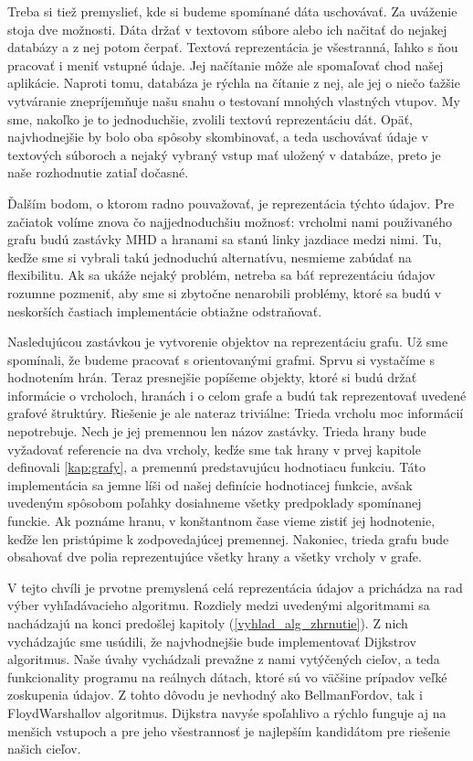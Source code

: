 Treba si tiež premyslieť, kde si budeme spomínané dáta uschovávať. Za uváženie stoja dve možnosti. Dáta držať v textovom súbore alebo ich načitať do nejakej databázy a z nej potom čerpať. Textová reprezentácia je všestranná, ľahko s ňou pracovať i meniť vstupné údaje. Jej načítanie môže ale spomaľovať chod našej aplikácie. Naproti tomu, databáza je rýchla na čítanie z nej, ale jej o niečo ťažšie vytváranie znepríjemňuje našu snahu o testovaní mnohých vlastných vtupov. My sme, nakoľko je to jednoduchšie, zvolili textovú reprezentáciu dát. Opäť, najvhodnejšie by bolo oba spôsoby skombinovať, a teda uschovávať údaje v textových súboroch a nejaký vybraný vstup mať uložený v databáze, preto je naše rozhodnutie zatiaľ dočasné.\newline

Ďalším bodom, o ktorom radno pouvažovať, je reprezentácia týchto údajov. Pre začiatok volíme znova čo najjednoduchšiu možnosť: vrcholmi nami použivaného grafu budú zastávky MHD a hranami sa stanú linky jazdiace medzi nimi. Tu, keďže sme si vybrali takú jednoduchú alternatívu, nesmieme zabúdať na flexibilitu. Ak sa ukáže nejaký problém, netreba sa báť reprezentáciu údajov rozumne pozmeniť, aby sme si zbytočne nenarobili problémy, ktoré sa budú v neskorších častiach implementácie obtiažne odstraňovať.\newline

Nasledujúcou zastávkou je vytvorenie objektov na reprezentáciu grafu. Už sme spomínali, že budeme pracovať s orientovanými grafmi. Sprvu si vystačíme s hodnotením hrán. Teraz presnejšie popíšeme objekty, ktoré si budú držať informácie o vrcholoch, hranách i o celom grafe a budú tak reprezentovať uvedené grafové štruktúry. Riešenie je ale nateraz triviálne: Trieda vrcholu moc informácií nepotrebuje. Nech je jej premennou len názov zastávky. Trieda hrany bude vyžadovať referencie na dva vrcholy, keďźe sme tak hrany v prvej kapitole definovali \ref{kap:grafy}, a premennú predstavujúcu hodnotiacu funkciu. Táto implementácia sa jemne líši od našej definície hodnotiacej funkcie, avšak uvedeným spôsobom poľahky dosiahneme všetky predpoklady spomínanej funckie. Ak poznáme hranu, v konštantnom čase vieme zistiť jej hodnotenie, keďže len pristúpime k zodpovedajúcej premennej. Nakoniec, trieda grafu bude obsahovať dve polia reprezentujúce všetky hrany a všetky vrcholy v grafe.\newline

V tejto chvíli je prvotne premyslená celá reprezentácia údajov a prichádza na rad výber vyhľadávacieho algoritmu. Rozdiely medzi uvedenými algoritmami sa nachádzajú na konci predošlej kapitoly (\ref{vyhlad_alg_zhrnutie}). Z nich vychádzajúc sme usúdili, že najvhodnejšie bude implementovať Dijkstrov algoritmus. Naše úvahy vychádzali prevažne z nami vytýčených cieľov, a teda funkcionality programu na reálnych dátach, ktoré sú vo väčšine prípadov veľké zoskupenia údajov. Z tohto dôvodu je nevhodný ako Bellman\textendash Fordov, tak i Floyd\textendash Warshallov algoritmus. Dijkstra navyśe spoľahlivo a rýchlo funguje aj na menšich vstupoch a pre jeho všestrannosť je najlepším kandidátom pre riešenie našich cieľov.\newline

